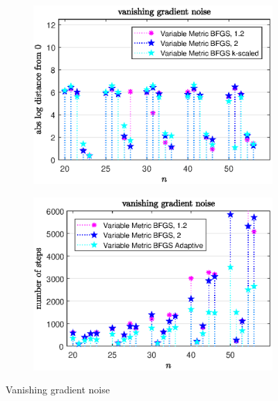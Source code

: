 \begin{figure}[H]
	\begin{subfigure}{0.49\textwidth}
		\includegraphics[width=\textwidth]{Pictures/Plots/vanishing_gradient_noise_compb.eps}%
	\end{subfigure}
	\begin{subfigure}{0.49\textwidth}
		\includegraphics[width=\textwidth]{Pictures/Plots/steps_vanishing_gradient_noise_compb.eps}%
	\end{subfigure}
	\caption{Vanishing gradient noise}%
	\label{fig_van_grad_noise_comp_large}%
\end{figure}




